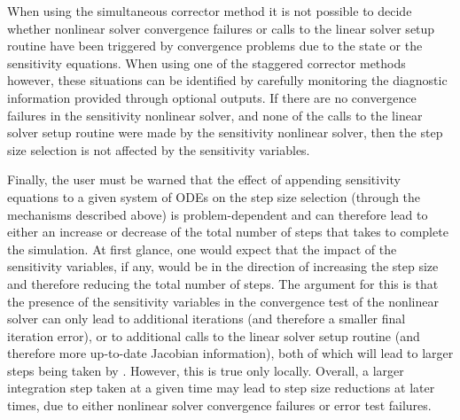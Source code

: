 When using the simultaneous corrector method it is not possible to decide whether 
nonlinear solver convergence failures or calls to the linear solver setup routine
have been triggered by convergence problems due to the state or the sensitivity 
equations.
When using one of the staggered corrector methods however, these situations can be 
identified by carefully monitoring the diagnostic information provided through 
optional outputs. If there are no convergence
failures in the sensitivity nonlinear solver, and none
of the calls to the linear solver setup routine were made by the sensitivity
nonlinear solver, then the step size selection is
not affected by the sensitivity variables.

Finally, the user must be warned that the effect of appending sensitivity 
equations to a given system of ODEs on the step size selection 
(through the mechanisms described above) is problem-dependent and can therefore
lead to either an increase or decrease of the total number of steps that {\cvodes} takes
to complete the simulation. At first glance, one would expect that the impact
of the sensitivity variables, if any, would be in the direction of increasing the
step size and therefore reducing the total number of steps. The argument for this
is that the presence of the sensitivity variables in the convergence test of the
nonlinear solver can only lead to additional iterations (and therefore a smaller
final iteration error), or to additional calls to the linear solver setup routine
(and therefore more up-to-date Jacobian information), both of which will lead
to larger steps being taken by {\cvodes}. However, this is true only locally.
Overall, a larger integration step taken at a given time may lead to 
step size reductions at later times, due to either nonlinear solver convergence
failures or error test failures.